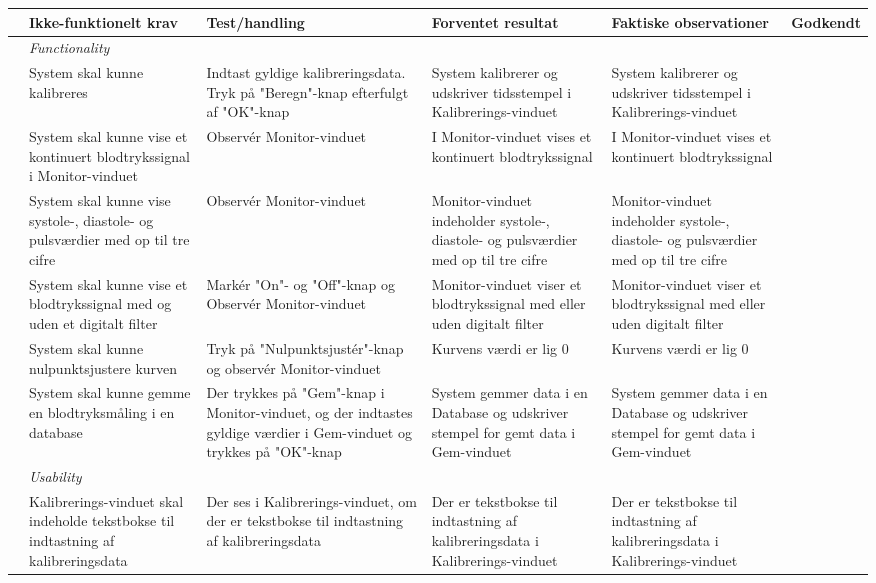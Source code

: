 \begin{longtabu} to 
	& Ikke-funktionelt krav & Test/handling & Forventet resultat & Faktiske observationer & Godkendt
	\\[-1ex] \midrule
	&  \textit{Functionality} &  &  & & \\ \midrule
	& System skal kunne kalibreres & Indtast gyldige kalibreringsdata. Tryk på "Beregn"\--knap efterfulgt af "OK"\--knap & System kalibrerer og udskriver tidsstempel i Kalibrerings-vinduet & System kalibrerer og udskriver tidsstempel i Kalibrerings-vinduet & {\Huge \checkmark}
	\\ \midrule
	& System skal kunne vise et kontinuert blodtrykssignal i Monitor-vinduet & Observér Monitor-vinduet & I Monitor-vinduet vises et kontinuert blodtrykssignal &  I Monitor-vinduet vises et kontinuert blodtrykssignal & {\Huge \checkmark}
	\\ \midrule
	& System skal kunne vise systole-, diastole- og pulsværdier med op til tre cifre & Observér Monitor-vinduet & Monitor-vinduet indeholder systole-, diastole- og pulsværdier med op til tre cifre & Monitor-vinduet indeholder systole-, diastole- og pulsværdier med op til tre cifre & {\Huge \checkmark}
	\\ \midrule
	& System skal kunne vise et blodtrykssignal med og uden et digitalt filter & Markér "On"- og "Off"\--knap og Observér Monitor-vinduet & Monitor-vinduet viser et blodtrykssignal med eller uden digitalt filter & Monitor-vinduet viser et blodtrykssignal med eller uden digitalt filter & {\Huge \checkmark}
	\\ \midrule
	& System skal kunne nulpunktsjustere kurven & Tryk på "Nulpunktsjustér"\--knap og observér Monitor-vinduet & Kurvens værdi er lig 0 & Kurvens værdi er lig 0 & {\Huge \checkmark}
	\\ \midrule
	& System skal kunne gemme en blodtryksmåling i en database & Der trykkes på "Gem"\--knap i Monitor-vinduet, og der indtastes gyldige værdier i Gem-vinduet og trykkes på "OK"\--knap & System gemmer data i en Database og udskriver stempel for gemt data i Gem-vinduet & System gemmer data i en Database og udskriver stempel for gemt data i Gem-vinduet & {\Huge \checkmark}
	\\ \midrule
	& \textit{Usability} &  &  & & \\ \midrule
	& Kalibrerings-vinduet skal indeholde tekstbokse til indtastning af kalibreringsdata & Der ses i Kalibrerings-vinduet, om der er tekstbokse til indtastning af kalibreringsdata & Der er tekstbokse til indtastning af kalibreringsdata i Kalibrerings-vinduet & Der er tekstbokse til indtastning af kalibreringsdata i Kalibrerings-vinduet & {\Huge \checkmark}

\end{longtabu}
